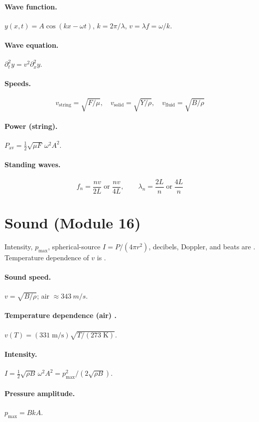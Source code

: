 \documentclass[11pt]{article}
\begin{document}
\paragraph{Wave function.} $y(x,t) = A\cos(kx - \omega t)$, $k = 2\pi/\lambda$, $v = \lambda f = \omega/k$.
\paragraph{Wave equation.} $\partial_t^{2} y = v^{2}\partial_x^{2} y$.
\paragraph{Speeds.}
\[
v_{\text{string}} = \sqrt{F/\mu},\quad
v_{\text{solid}} = \sqrt{Y/\rho},\quad
v_{\text{fluid}} = \sqrt{B/\rho}
\]
\paragraph{Power (string).} $P_{\text{av}} = \tfrac{1}{2}\sqrt{\mu F}\,\omega^{2}A^{2}$.
\paragraph{Standing waves.}
\[
f_n = \frac{nv}{2L}\;\text{or}\;\frac{nv}{4L},\qquad
\lambda_n = \frac{2L}{n}\;\text{or}\;\frac{4L}{n}
\]

\section{Sound (Module 16)}
Intensity, $p_{\max}$, spherical-source $I = P/(4\pi r^2)$, decibels, Doppler,
and beats are . Temperature dependence of $v$ is
.

\paragraph{Sound speed.} $v = \sqrt{B/\rho}$; air $\approx \SI{343}{m/s}$.
\paragraph{Temperature dependence (air) .} $v(T) = (331\;\mathrm{m/s})\sqrt{T/(273\;\mathrm{K})}$.
\paragraph{Intensity.} $I = \tfrac{1}{2}\sqrt{\rho B}\,\omega^{2}A^{2} = p_{\max}^{2}/(2\sqrt{\rho B})$.
\paragraph{Pressure amplitude.} $p_{\max} = BkA$.
\end{document}

